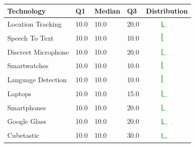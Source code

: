\begin{table}[t]
\begin{center}
\small
\begin{tabular}{| p{2cm} | p{1cm} | p{1cm} | p{1cm} | c |}
\hline
Technology & Q1 &  Median & Q3 & Distribution  \\ 
\hline
Location Tracking & 10.0 & 10.0 & 20.0 & \includegraphics[width = 2cm, height = 0.5cm]{tables/locationtrackingrisk} \\ 
Speech To Text & 10.0 & 10.0 & 10.0 & \includegraphics[width = 2cm, height = 0.5cm]{tables/speechtotextrisk} \\ 
Discreet Microphone & 10.0 & 10.0 & 20.0 & \includegraphics[width = 2cm, height = 0.5cm]{tables/discreetmicrophonerisk} \\ 
Smartwatches & 10.0 & 10.0 & 10.0 & \includegraphics[width = 2cm, height = 0.5cm]{tables/smartwatchesrisk} \\ 
Language Detection & 10.0 & 10.0 & 10.0 & \includegraphics[width = 2cm, height = 0.5cm]{tables/languagedetectionrisk} \\ 
Laptops & 10.0 & 10.0 & 15.0 & \includegraphics[width = 2cm, height = 0.5cm]{tables/laptopsrisk} \\ 
Smartphones & 10.0 & 10.0 & 20.0 & \includegraphics[width = 2cm, height = 0.5cm]{tables/smartphonesrisk} \\ 
Google Glass & 10.0 & 10.0 & 20.0 & \includegraphics[width = 2cm, height = 0.5cm]{tables/googleglassrisk} \\ 
Cubetastic & 10.0 & 10.0 & 30.0 & \includegraphics[width = 2cm, height = 0.5cm]{tables/cubetasticrisk} \\ 

\end{tabular}
\end{center}
\end{table}
